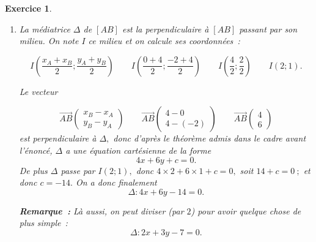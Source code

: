 \documentclass[10pt]{article}
\newtheorem{exo}{Exercice}
\begin{document}
\begin{exo}
\begin{enumerate}
\item La médiatrice $\Delta$ de $\left[AB\right]$ est la perpendiculaire à $\left[AB\right]$  passant par son milieu. On note $I$ ce milieu et on calcule ses coordonnées~:

\[I\left(\frac{x_A+x_B}{2};\frac{y_A+y_B}{2}\right)\qquad I\left(\frac{0+4}{2};\frac{-2+4}{2}\right)\qquad I\left(\frac{4}{2};\frac{2}{2}\right)\qquad I\left(2;1\right).\]

Le vecteur 

\[\overrightarrow{AB}\begin{pmatrix} x_B-x_A\\y_B-y_A \end{pmatrix}\qquad \overrightarrow{AB}\begin{pmatrix} 4-0\\4-(-2) \end{pmatrix}\qquad \overrightarrow{AB}\begin{pmatrix} 4\\6 \end{pmatrix}\]
est perpendiculaire à $\Delta,$ donc d'après le théorème admis dans le cadre avant l'énoncé, $\Delta$ a une équation cartésienne de la forme
\[4x+6y+c=0.\]
De plus $\Delta$ passe par $I(2;1),$ donc $4\times 2+6\times 1+c=0,$ soit $14+c=0~;$ et donc $c=-14.$ On a donc finalement
\[\Delta:4x+6y-14=0.\]

\medskip

\textbf{Remarque~:} Là aussi, on peut diviser (par $2$) pour avoir quelque chose de plus simple~:
\[\Delta:2x+3y-7=0.\]



\end{enumerate}
\end{exo}
\end{document}
